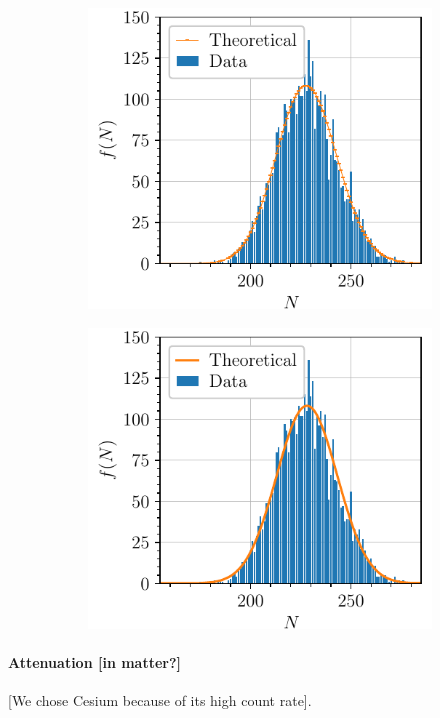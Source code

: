 \begin{figure}[htbp]
\begin{subfigure}{0.495\textwidth}
        \includegraphics[scale=1]{figures/highmean_poisson.pdf}
    \end{subfigure}
    \hfill
    \begin{subfigure}{0.495\textwidth}
        \includegraphics[scale=1]{figures/highmean_gaussian.pdf}
    \end{subfigure}
\end{figure}

\paragraph{Attenuation [in matter?]}
[We chose Cesium because of its high count rate].

